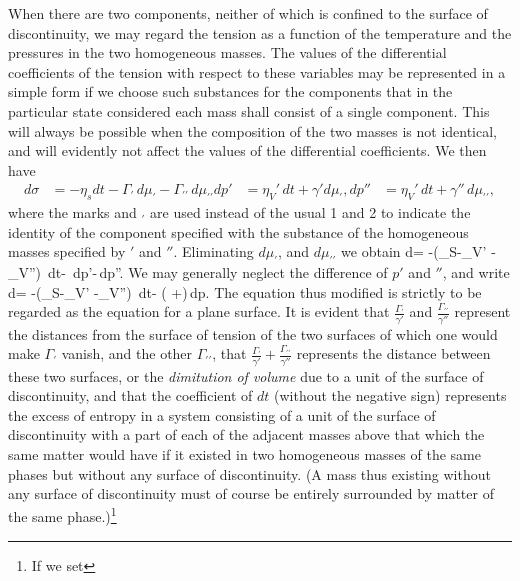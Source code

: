 \documentclass[12pt]{memoir}
\begin{document}
{When there are two components, neither of which is confined to the surface of discontinuity, we may regard the tension as a function of the temperature and the pressures in the two homogeneous masses. The values of the differential coefficients of the tension with respect to these variables may be represented in a simple form if we choose such substances for the components that in the particular state considered each mass shall consist of a single component. This will always be possible when the composition of the two masses is not identical, and will evidently not affect the values of the differential coefficients. We then have
\begin{align*}
d\sigma &= - \eta_s dt - \Gamma_\prime \, d\mu_\prime - \Gamma_{\prime \prime} \, d\mu_{\prime\prime}
dp'  &= \eta_V'\,dt + \gamma'd\mu_\prime,
dp'' &= \eta_V'\,dt + \gamma''\, d\mu_{\prime\prime},\end{align*}
where the marks and $_\prime$ are used instead of the usual 1 and 2 to indicate the identity of the component specified with the substance of the homogeneous masses specified by $'$ and $''$. Eliminating $d\mu_\prime$, and $d\mu_{\prime\prime}$ we obtain
\eqs d\sigma= -\left(\eta_S-\eta_V' -\eta_V''\right)\, dt- \,dp'-\,dp''. \label{579} \eqe
We may generally neglect the difference of $p'$ and $''$, and write
\eqs d\sigma= -\left(\eta_S-\eta_V' -\eta_V''\right)\, dt- \left( +\right)\,dp.  \label{580} \eqe
The equation thus modified is strictly to be regarded as the equation
for a plane surface. It is evident that $\frac{\Gamma_\prime}{\gamma'}$ and $\frac{\Gamma_{\prime\prime}}{\gamma''}$ represent the distances from the surface of tension of the two surfaces of which one would make $\Gamma_{\prime}$ vanish, and the other $\Gamma_{\prime\prime}$, that $ \frac{\Gamma_\prime}{\gamma'}+\frac{\Gamma_{\prime\prime}}{\gamma''}$ represents the distance between these two surfaces, or the \textit{dimitution of volume} due to a unit of the surface of discontinuity, and that the coefficient of $dt$ (without the negative sign) represents the excess of entropy in a system consisting of a unit of the surface of discontinuity with a part of each of the adjacent masses above that which the same matter would have if it existed in two homogeneous masses of the same phases but without any surface of discontinuity. (A mass thus existing without any surface of discontinuity must of course be entirely surrounded by matter of the same phase.)\footnote{If we set
}}
\end{document}
